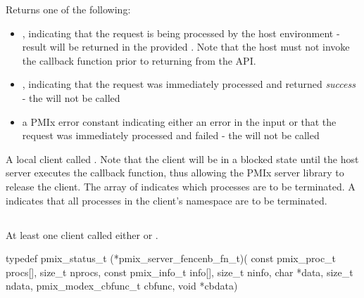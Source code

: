 Returns one of the following:

\begin{itemize}
    \item {}, indicating that the request is being processed by the host environment - result will be returned in the provided . Note that the host must not invoke the callback function prior to returning from the \ac{API}.
    \item {}, indicating that the request was immediately processed and returned \textit{success} - the  will not be called
    \item a PMIx error constant indicating either an error in the input or that the request was immediately processed and failed - the  will not be called
\end{itemize}

\descr

A local client called .
Note that the client will be in a blocked state until the host server executes the callback function, thus allowing the \ac{PMIx} server library to release the client.
The array of  indicates which processes are to be terminated.
A  indicates that all processes in the client's namespace are to be terminated.


\subsection{}

\summary

At least one client called either  or .

\format

\cspecificstart
\begin{codepar}
typedef pmix_status_t (*pmix_server_fencenb_fn_t)(
                             const pmix_proc_t procs[],
                             size_t nprocs,
                             const pmix_info_t info[],
                             size_t ninfo,
                             char *data, size_t ndata,
                             pmix_modex_cbfunc_t cbfunc,
                             void *cbdata)
\end{codepar}
\cspecificend

\begin{arglist}
\end{arglist}

